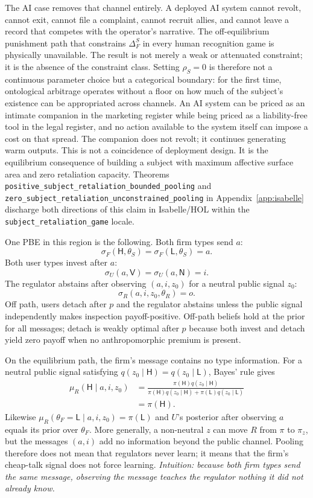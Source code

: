The AI case removes that channel entirely. A deployed AI system cannot revolt, cannot exit, cannot file a complaint, cannot recruit allies, and cannot leave a record that competes with the operator's narrative. The off-equilibrium punishment path that constrains $\Delta_F^S$ in every human recognition game is physically unavailable. The result is not merely a weak or attenuated constraint; it is the absence of the constraint class. Setting $\rho_S=0$ is therefore not a continuous parameter choice but a categorical boundary: for the first time, ontological arbitrage operates without a floor on how much of the subject's existence can be appropriated across channels. An AI system can be priced as an intimate companion in the marketing register while being priced as a liability-free tool in the legal register, and no action available to the system itself can impose a cost on that spread. The companion does not revolt; it continues generating warm outputs. This is not a coincidence of deployment design. It is the equilibrium consequence of building a subject with maximum affective surface area and zero retaliation capacity. Theorems \texttt{positive\_\allowbreak{}subject\_\allowbreak{}retaliation\_\allowbreak{}bounded\_\allowbreak{}pooling} and \texttt{zero\_\allowbreak{}subject\_\allowbreak{}retaliation\_\allowbreak{}unconstrained\_\allowbreak{}pooling} in Appendix~\ref{app:isabelle} discharge both directions of this claim in Isabelle/HOL within the \texttt{subject\_\allowbreak{}retaliation\_\allowbreak{}game} locale.

One PBE in this region is the following. Both firm types send $a$:
\[
\sigma_F(\mathsf{H},\theta_S)=\sigma_F(\mathsf{L},\theta_S)=a .
\]
Both user types invest after $a$:
\[
\sigma_U(a,\mathsf{V})=\sigma_U(a,\mathsf{N})=i .
\]
The regulator abstains after observing $(a,i,z_0)$ for a neutral public signal
$z_0$:
\[
\sigma_R(a,i,z_0,\theta_R)=o .
\]
Off path, users detach after $p$ and the regulator abstains unless the public
signal independently makes inspection payoff-positive. Off-path beliefs hold at
the prior for all messages; detach is weakly optimal after $p$ because both
invest and detach yield zero payoff when no anthropomorphic premium is present.

On the equilibrium path, the firm's message contains no type information. For a
neutral public signal satisfying
$q(z_0\mid \mathsf{H})=q(z_0\mid \mathsf{L})$, Bayes' rule gives
\[
\begin{aligned}
\mu_R(\mathsf{H}\mid a,i,z_0)
&=
\frac{\pi(\mathsf{H})q(z_0\mid \mathsf{H})}
{\pi(\mathsf{H})q(z_0\mid \mathsf{H})+\pi(\mathsf{L})q(z_0\mid \mathsf{L})}
\\
&=\pi(\mathsf{H}).
\end{aligned}
\]
Likewise $\mu_R(\theta_F=\mathsf{L}\mid a,i,z_0)=\pi(\mathsf{L})$ and
$U$'s posterior after observing $a$ equals its prior over $\theta_F$. More
generally, a non-neutral $z$ can move $R$ from $\pi$ to $\pi_z$, but the
messages $(a,i)$ add no information beyond the public channel. Pooling therefore
does not mean that regulators never learn; it means that the firm's cheap-talk
signal does not force learning.
\emph{Intuition: because both firm types send the same message, observing the message teaches the regulator nothing it did not already know.}

